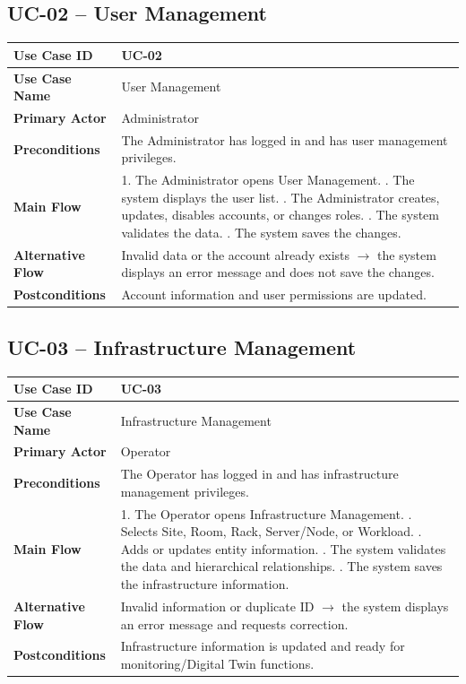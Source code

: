 \subsection*{UC-02 -- User Management}
\noindent
\begin{tabularx}{\textwidth}{|>{\bfseries}p{3.2cm}|X|}
\hline
Use Case ID & UC-02 \\ \hline
Use Case Name & User Management \\ \hline
Primary Actor & Administrator \\ \hline
Preconditions & The Administrator has logged in and has user management privileges. \\ \hline
Main Flow & 1. The Administrator opens User Management. \newline
2. The system displays the user list. \newline
3. The Administrator creates, updates, disables accounts, or changes roles. \newline
4. The system validates the data. \newline
5. The system saves the changes. \\ \hline
Alternative Flow & Invalid data or the account already exists $\rightarrow$ the system displays an error message and does not save the changes. \\ \hline
Postconditions & Account information and user permissions are updated. \\ \hline
\end{tabularx}

\vspace{1.5em}

\subsection*{UC-03 -- Infrastructure Management}
\noindent
\begin{tabularx}{\textwidth}{|>{\bfseries}p{3.2cm}|X|}
\hline
Use Case ID & UC-03 \\ \hline
Use Case Name & Infrastructure Management \\ \hline
Primary Actor & Operator \\ \hline
Preconditions & The Operator has logged in and has infrastructure management privileges. \\ \hline
Main Flow & 1. The Operator opens Infrastructure Management. \newline
2. Selects Site, Room, Rack, Server/Node, or Workload. \newline
3. Adds or updates entity information. \newline
4. The system validates the data and hierarchical relationships. \newline
5. The system saves the infrastructure information. \\ \hline
Alternative Flow & Invalid information or duplicate ID $\rightarrow$ the system displays an error message and requests correction. \\ \hline
Postconditions & Infrastructure information is updated and ready for monitoring/Digital Twin functions. \\ \hline
\end{tabularx}

